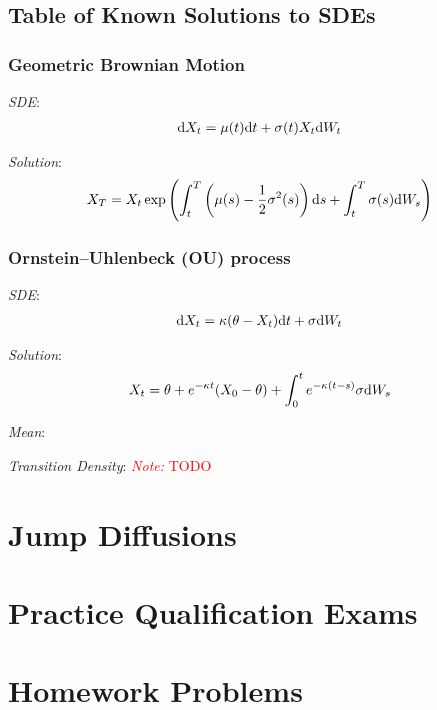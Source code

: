 \documentclass[12pt]{article}
\newcommand{\note}[1]{\textcolor{red}{\textit{Note:} #1}}
\begin{document}
\subsection{Table of Known Solutions to SDEs}
\subsubsection{Geometric Brownian Motion}
\textit{SDE}:
\begin{align*}
    \mathrm{d} X_t = \mu(t) \mathrm{d} t + \sigma(t) X_t \mathrm{d} W_t
\end{align*}

\textit{Solution}:
\begin{align*}
    X_T = X_t  \exp\left( \int_t^T \left( \mu(s) - \frac{1}{2}\sigma^2(s)\right)\mathrm{d} s + \int_t^T\sigma(s)\mathrm{d} W_s \right)
\end{align*}


\subsubsection{Ornstein--Uhlenbeck (OU) process}
\textit{SDE}:
\begin{align*}
    \mathrm{d} X_t = \kappa(\theta-X_t)\mathrm{d} t + \sigma \mathrm{d} W_t
\end{align*}

\textit{Solution}:
\begin{align*}
    X_t = \theta + e^{-\kappa t}(X_0-\theta) + \int_0^t e^{-\kappa(t-s)}\sigma \mathrm{d} W_s
\end{align*}

\textit{Mean}:


\textit{Transition Density}:
\note{TODO}



\pagebreak
\section{Jump Diffusions}



\pagebreak
\section{Practice Qualification Exams}


\pagebreak
\section{Homework Problems}








\end{document}
